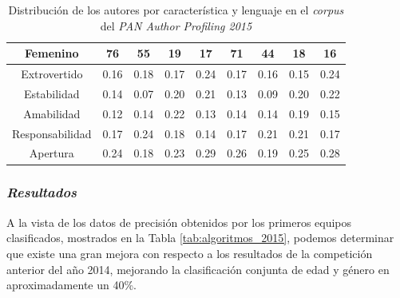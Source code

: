\begin{table}[H]
{\begin{tabular}{|c|c|c|c|c|c|c|c|c|}
			Femenino                               & 76                                                                & 55                                                       & 19                & 17                & 71              & 44               & 18                & 16                \\ \hline
			\hline
			Extrovertido                           & 0.16                                                              & 0.18                                                     & 0.17              & 0.24              & 0.17            & 0.16             & 0.15              & 0.24              \\ \hline
			Estabilidad                            & 0.14                                                              & 0.07                                                     & 0.20              & 0.21              & 0.13            & 0.09             & 0.20              & 0.22              \\ \hline
			Amabilidad                             & 0.12                                                              & 0.14                                                     & 0.22              & 0.13              & 0.14            & 0.14             & 0.19              & 0.15              \\ \hline
			Responsabilidad                        & 0.17                                                              & 0.24                                                     & 0.18              & 0.14              & 0.17            & 0.21             & 0.21              & 0.17              \\ \hline
			Apertura                               & 0.24                                                              & 0.18                                                     & 0.23              & 0.29              & 0.26            & 0.19             & 0.25              & 0.28              \\ \hline
		\end{tabular}
	}
	\caption{Distribución de los autores por característica y lenguaje en el \textit{corpus} del \textit{PAN Author Profiling 2015}}
	\label{tab:dataset_2015}
\end{table}

\subsubsection{\textit{Resultados}}

A la vista de los datos de precisión obtenidos por los primeros equipos clasificados, mostrados en la Tabla \ref{tab:algoritmos_2015},
podemos determinar que existe una gran mejora con respecto a los resultados de la competición anterior del año 2014, mejorando
la clasificación conjunta de edad y género en aproximadamente un 40\%.

